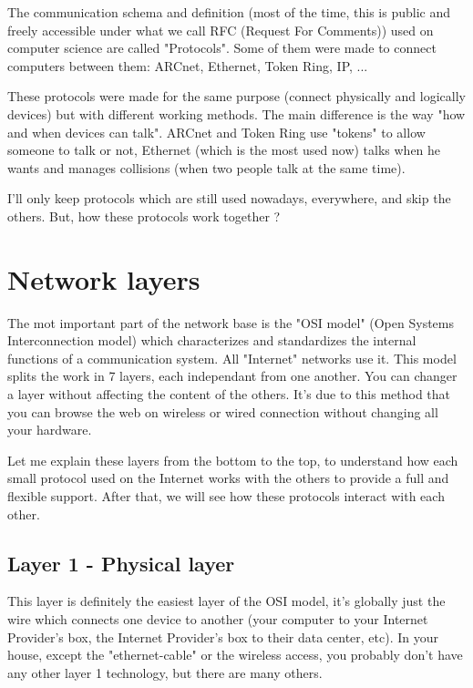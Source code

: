 \documentclass{article}
\begin{document}
	The communication schema and definition (most of the time, this is public and freely accessible under what we
	call RFC (Request For Comments)) used on computer science are called "Protocols".
	Some of them were made to connect computers between them: ARCnet, Ethernet, Token Ring, IP, ...
	
	These protocols were made for the same purpose (connect physically and logically devices) but with different
	working methods. The main difference is the way "how and when devices can talk".
	ARCnet and Token Ring use "tokens" to allow someone to talk or not, Ethernet (which is the most used now)
	talks when he wants and manages collisions (when two people talk at the same time).
	
	I'll only keep protocols which are still used nowadays, everywhere, and skip the others.
	But, how these protocols work together ?

\section{Network layers}

	The mot important part of the network base is the "OSI model" (Open Systems Interconnection model) which characterizes and
	standardizes the internal functions of a communication system. All "Internet" networks use it. This model splits
	the work in 7 layers, each independant from one another. You can changer a layer without affecting the content
	of the others. It's due to this method that you can browse the web on wireless or wired connection without changing
	all your hardware.
	
	Let me explain these layers from the bottom to the top, to understand how each small protocol used on the Internet
	works with the others to provide a full and flexible support. After that, we will see how these protocols interact
	with each other.
	
	\subsection{Layer 1 - Physical layer}
	
	This layer is definitely the easiest layer of the OSI model, it's globally just the wire which connects one
	device to another (your computer to your Internet Provider's box, the Internet Provider's box to their
	data center, etc). In your house, except the "ethernet-cable" or the wireless access, you probably don't have
	any other layer 1 technology, but there are many others.
	
\end{document}
